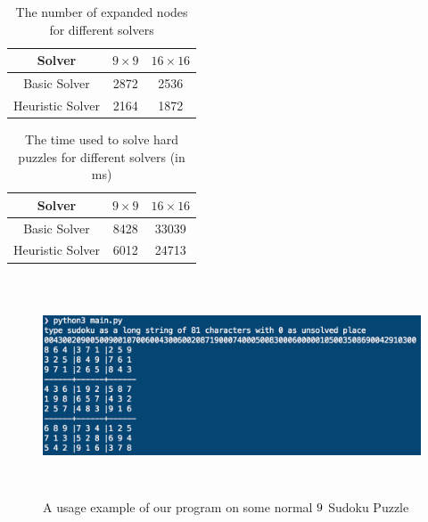 \documentclass[12pt]{article}
\begin{document}
\begin{spacing}{1.1}
\begin{table}[h]
	\centering
\begin{tabular}{|c|c|c|}
	\hline
	Solver & $9\times 9$ & $16\times 16$\\
	\hline
	Basic Solver & 2872 & 2536\\
	\hline
	Heuristic Solver & 2164 & 1872\\
	\hline
\end{tabular}
\caption{The number of expanded nodes for different solvers}
\end{table}

\begin{table}[h]
	\centering
	\begin{tabular}{|c|c|c|}
		\hline
		Solver & $9\times 9$ & $16\times 16$\\
		\hline
		Basic Solver & 8428 & 33039\\
		\hline
		Heuristic Solver & 6012 & 24713\\
		\hline
	\end{tabular}
\caption{The time used to solve hard puzzles for different solvers (in ms)}
\end{table}


\begin{figure}[h!]
\centering
\includegraphics[height=6.5cm]{example}
\caption{A usage example of our program on some normal $9\time9$ Sudoku Puzzle}
\end{figure}


\end{spacing}
\end{document}
